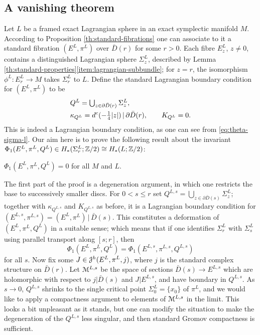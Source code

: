 \documentclass[10pt,letterpaper]{article}
\begin{document}
%

\subsection{A vanishing theorem\label{sec:vanishing}}

Let $L$ be a framed exact Lagrangian sphere in an exact symplectic manifold
$M$. According to Proposition \ref{th:standard-fibrations} one can associate to
it a standard fibration $(E^L,\pi^L)$ over $\bar{D}(r)$ for some $r>0$. Each
fibre $E^L_z$, $z \neq 0$, contains a distinguished Lagrangian sphere
$\Sigma_z^L$, described by Lemma
\ref{th:standard-properties}\ref{item:lagrangian-subbundle}; for $z = r$, the
isomorphism $\phi^L: E^L_r \rightarrow M$ takes $\Sigma_r^L$ to $L$. Define the
standard Lagrangian boundary condition for $(E^L,\pi^L)$ to be
\begin{equation} \label{eq:standard-boundary}
\begin{split}
& \textstyle Q^L = \textstyle\bigcup_{z \in \partial\bar{D}(r)} \Sigma_z^L, \\
& \kappa_{Q^L} =d^c(-{\textstyle\frac{1}{4}}|z|)\,|\,\partial\bar{D}(r), \qquad K_{Q^L} = 0.
\end{split}
\end{equation}
This is indeed a Lagrangian boundary condition, as one can see from
\eqref{eq:theta-sigma-l}. Our aim here is to prove the following result about
the invariant $\Phi_1(E^L,\pi^L,Q^L) \in H_*(\Sigma_r^L;\mathbb{Z}/2) \cong
H_*(L;\mathbb{Z}/2)$:

\begin{prop} \label{th:vanishing}
$\Phi_1(E^L,\pi^L,Q^L) = 0$ for all $M$ and $L$.
\end{prop}

The first part of the proof is a degeneration argument, in which one restricts
the base to successively smaller discs. For $0< s \leq r$ set $Q^{L,s} =
\textstyle \bigcup_{z \in \partial\bar{D}(s)} \Sigma^L_z$; together with
$\kappa_{Q^{L,s}}$ and $K_{Q^{L,s}}$ as before, it is a Lagrangian boundary
condition for $(E^{L,s},\pi^{L,s}) = (E^L,\pi^L)\,|\,\bar{D}(s)$. This
constitutes a deformation of $(E^L,\pi^L,Q^L)$ in a suitable sense; which means
that if one identifies $\Sigma_r^L$ with $\Sigma_s^L$ using parallel transport
along $[s;r]$, then
\begin{equation} \label{eq:deformation-equation}
\Phi_1(E^L,\pi^L,Q^L) = \Phi_1(E^{L,s},\pi^{L,s},Q^{L,s})
\end{equation}
for all $s$. Now fix some $J \in \mathcal{J}^h(E^L,\pi^L,j)$, where $j$ is the standard
complex structure on $\bar{D}(r)$. Let $\mathcal{M}^{L,s}$ be the space of sections
$\bar{D}(s) \rightarrow E^{L,s}$ which are holomorphic with respect to
$j|\bar{D}(s)$ and $J|E^{L,s}$, and have boundary in $Q^{L,s}$. As $s
\rightarrow 0$, $Q^{L,s}$ shrinks to the single critical point $\Sigma^L_0 =
\{x_0\}$ of $\pi^L$, and we would like to apply a compactness argument to
elements of $\mathcal{M}^{L,s}$ in the limit. This looks a bit unpleasant as it stands,
but one can modify the situation to make the degeneration of the $Q^{L,s}$ less
singular, and then standard Gromov compactness is sufficient.
\end{document}
